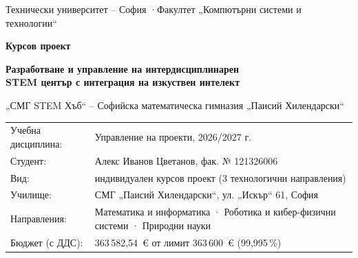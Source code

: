 \documentclass[11pt,a4paper]{article}
\newcommand{\NumTotal}{363\,582,54~€}
\newcommand{\PctUse}{99,995\,\%}
\begin{document}
\thispagestyle{empty}
\begin{center}
  {\small Технически университет – София \quad·\quad Факултет „Компютърни системи и технологии“\par}
  \vspace{2.2cm}
  {\Large\bfseries\color{navy} Курсов проект\par}
  \vspace{6pt}
  {\LARGE\bfseries Разработване и управление на интердисциплинарен\\[2pt] STEM център с интеграция на изкуствен интелект\par}
  \vspace{14pt}
  {\Large „СМГ STEM Хъб“ – Софийска математическа гимназия „Паисий Хилендарски“\par}
  \vspace{1.6cm}
  \begin{tabular}{@{}lp{}@{}}
    Учебна дисциплина: & Управление на проекти, 2026/2027 г. \\
    Студент:           & Алекс Иванов Цветанов, фак. № 121326006 \\
    Вид:               & индивидуален курсов проект (3 технологични направления) \\
    Училище:           & СМГ „Паисий Хилендарски“, ул. „Искър“ 61, София \\
    Направления:       & Математика и информатика · Роботика и кибер-физични системи · Природни науки \\
    Бюджет (с ДДС):    & \NumTotal{} от лимит 363\,600~€ (\PctUse) \\
  \end{tabular}
\end{center}
\end{document}
